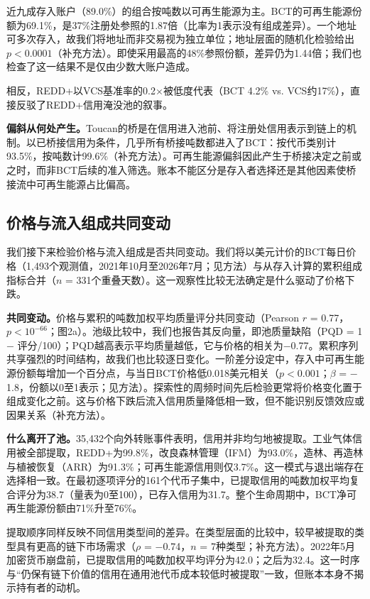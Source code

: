 \documentclass[12pt,a4paper]{article}
\begin{document}
近九成存入账户（89.0\%）的组合按吨数以可再生能源为主。BCT的可再生能源份额为69.1\%，是37\%注册处参照的1.87倍（比率为1表示没有组成差异）。一个地址可多次存入，故我们将地址而非交易视为独立单位；地址层面的随机化检验给出$p < 0.0001$（补充方法）。即使采用最高的48\%参照份额，差异仍为1.44倍；我们也检查了这一结果不是仅由少数大账户造成。

相反，REDD+以VCS基准率的0.2$\times$被低度代表（BCT 4.2\% vs. VCS约17\%），直接反驳了REDD+信用淹没池的叙事。

\textbf{偏斜从何处产生。}Toucan的桥是在信用进入池前、将注册处信用表示到链上的机制。以已桥接信用为条件，几乎所有桥接吨数都进入了BCT：按代币类别计93.5\%，按吨数计99.6\%（补充方法）。可再生能源偏斜因此产生于桥接决定之前或之时，而非BCT后续的准入筛选。账本不能区分是存入者选择还是其他因素使桥接流中可再生能源占比偏高。


\subsection*{价格与流入组成共同变动}

我们接下来检验价格与流入组成是否共同变动。我们将以美元计价的BCT每日价格（1,493个观测值，2021年10月至2026年7月；见方法）与从存入计算的累积组成指标合并（$n$ = 331个重叠天数）。这一观察性比较无法确定是什么驱动了价格下跌。

\textbf{共同变动。}价格与累积的吨数加权平均质量评分共同变动（Pearson $r$ = 0.77，$p < 10^{-66}$；图2a）。池级比较中，我们也报告其反向量，即池质量缺陷（PQD = 1 $-$ 评分/100）；PQD越高表示平均质量越低，它与价格的相关为$-$0.77。累积序列共享强烈的时间结构，故我们也比较逐日变化。一阶差分设定中，存入中可再生能源份额每增加一个百分点，与当日BCT价格低0.018美元相关（$p < 0.001$；$\beta$ = $-$1.8，份额以0至1表示；见方法）。探索性的周频时间先后检验更常将价格变化置于组成变化之前。这与价格下跌后流入信用质量降低相一致，但不能识别反馈效应或因果关系（补充方法）。

\textbf{什么离开了池。}35,432个向外转账事件表明，信用并非均匀地被提取。工业气体信用被全部提取，REDD+为99.8\%，改良森林管理（IFM）为93.0\%，造林、再造林与植被恢复（ARR）为91.3\%；可再生能源信用则仅3.7\%。这一模式与退出端存在选择相一致。在最初逐项评分的161个代币子集中，已提取信用的吨数加权平均复合评分为38.7（量表为0至100），已存入信用为31.7。整个生命周期中，BCT净可再生能源份额由71\%升至76\%。

提取顺序同样反映不同信用类型间的差异。在类型层面的比较中，较早被提取的类型具有更高的链下市场需求（$\rho$ = $-$0.74，$n$ = 7种类型；补充方法）。2022年5月加密货币崩盘前，已提取信用的吨数加权平均评分为42.0；之后为32.4。这一时序与“仍保有链下价值的信用在通用池代币成本较低时被提取”一致，但账本本身不揭示持有者的动机。
\end{document}
